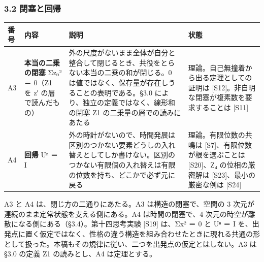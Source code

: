 \documentclass[
  a4paper,
]{ltjsarticle}
\newcounter{none} %
\begin{document}
\subsubsection{3.2 閉塞と回帰}\label{ux9589ux585eux3068ux56deux5e30}

{\def\LTcaptype{none} %
\begin{longtable}[]{@{}
  >{\raggedright\arraybackslash}p{}
  >{\raggedright\arraybackslash}p{}
  >{\raggedright\arraybackslash}p{}
  >{\raggedright\arraybackslash}p{}@{}}
\toprule\noalign{}
\begin{minipage}[b]{\linewidth}\raggedright
番号
\end{minipage} & \begin{minipage}[b]{\linewidth}\raggedright
内容
\end{minipage} & \begin{minipage}[b]{\linewidth}\raggedright
説明
\end{minipage} & \begin{minipage}[b]{\linewidth}\raggedright
状態
\end{minipage} \\
\midrule\noalign{}
\endhead
\bottomrule\noalign{}
\endlastfoot
A3 & \textbf{本当の二乗の閉塞} Σzₙ² ＝ 0（Z1 を z′ の層で読んだもの） &
外の尺度がないまま全体が自分と整合して閉じるとき、共役をとらない本当の二乗の和が閉じる。0
は値ではなく、保存量が存在しうることの表明である。§3.0
により、独立の定義ではなく、線形和の閉塞 Z1 の二乗量の層での読みにあたる
& 理論。自己無撞着から出る定理としての証明は
{[}S12{]}。非自明な閉塞が複素数を要求することは {[}S11{]} \\
A4 & \textbf{回帰} Uⁿ ＝ I &
外の時計がないので、時間発展は区別のつかない要素どうしの入れ替えとしてしか書けない。区別のつかない有限個の入れ替えは有限の位数を持ち、どこかで必ず元に戻る
& 理論。有限位数の共鳴は {[}S7{]}、有限位数が根を選ぶことは
{[}S20{]}、Z₄ の位相の厳密解は {[}S23{]}、最小の厳密な例は {[}S24{]} \\
\end{longtable}
}

A3 と A4 は、閉じ方の二通りにあたる。A3 は構造の閉塞で、空間の 3
次元が連続のまま定常状態を支える側にある。A4 は時間の閉塞で、4
次元の時空が離散になる側にある（§3.4）。第十四思考実験 {[}S19{]} は、Σx²
＝ 0 と Uⁿ ＝ I
を、出発点に置く仮定ではなく、性格の違う構造を組み合わせたときに現れる共通の形として扱った。本稿もその規律に従い、二つを出発点の仮定とはしない。A3
は §3.0 の定義 Z1 の読みとし、A4 は定理とする。
\end{document}
